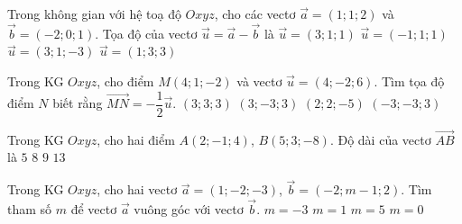 \begin{ex}%
Trong không gian với hệ toạ độ $Oxyz$, cho các vectơ $\overrightarrow{a}=(1;1;2)$ và $\overrightarrow{b}=(-2;0;1)$. Tọa độ của vectơ $\overrightarrow{u}=\overrightarrow{a}-\overrightarrow{b}$ là
\choice
{\True $\overrightarrow{u}=(3;1;1)$}
{$\overrightarrow{u}=(-1;1;1)$}
{$\overrightarrow{u}=(3;1;-3)$}
{$\overrightarrow{u}=(1;3;3)$}
\end{ex}

\begin{ex}%
Trong KG $Oxyz$, cho điểm $M(4;1;-2)$ và vectơ $\overrightarrow{u}=(4;-2;6)$. Tìm tọa độ điểm $N$ biết rằng $\overrightarrow{MN}=-\dfrac{1}{2}\overrightarrow{u}$.
\choice
{$(3;3;3)$}
{$(3;-3;3)$}
{\True $(2;2;-5)$}
{$(-3;-3;3)$}
\end{ex}

\begin{ex}%
Trong KG $Oxyz$, cho hai điểm $A(2;-1;4)$, $B(5;3;-8)$. Độ dài của vectơ $\overrightarrow{AB}$ là
\choice
{$5$}
{$8$}
{$9$}
{\True $13$}
\end{ex}

\begin{ex}%
Trong KG $Oxyz$, cho hai vectơ $\overrightarrow{a}=(1;-2;-3)$, $\overrightarrow{b}=(-2;m-1;2)$. Tìm tham số $m$ để vectơ $\overrightarrow{a}$ vuông góc với vectơ $\overrightarrow{b}$.
\choice
{\True $m=-3$}
{$m=1$}
{$m=5$}
{$m=0$}
\end{ex}

